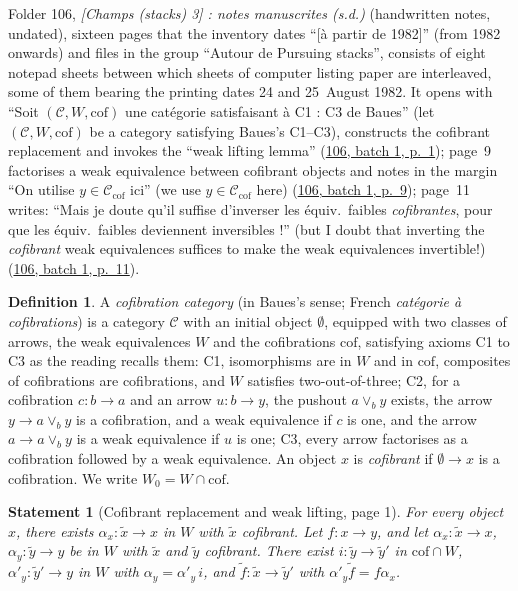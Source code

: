 \documentclass[11pt]{article}
\newcommand{\q}[1]{“#1”}
\newcommand{\fr}[1]{\textfrench{#1}}
\newcommand{\lot}[3]{\href{https://grothendieck.commutator.io/\##1/#2/p#3}{#1, batch #2, p.~#3}}
\theoremstyle{plain}
\newtheorem*{enonce}{Statement}
\theoremstyle{definition}
\newtheorem*{definition}{Definition}
\theoremstyle{remark}
\begin{document}
Folder 106, \emph{\fr{[Champs (stacks) 3] : notes manuscrites (s.d.)}} (handwritten notes, undated), sixteen pages that the inventory dates \q{\fr{[à partir de 1982]}} (from 1982 onwards) and files in the group \q{Autour de Pursuing stacks}, consists of eight notepad sheets between which sheets of computer listing paper are interleaved, some of them bearing the printing dates 24 and 25~August 1982. It opens with \q{\fr{Soit $(\mathcal{C}, W, \mathrm{cof})$ une catégorie satisfaisant à C1 : C3 de Baues}} (let $(\mathcal{C}, W, \mathrm{cof})$ be a category satisfying Baues's C1--C3), constructs the cofibrant replacement and invokes the \q{weak lifting lemma} (\lot{106}{1}{1}); page~9 factorises a weak equivalence between cofibrant objects and notes in the margin \q{\fr{On utilise $y \in \mathcal{C}_{\mathrm{cof}}$ ici}} (we use $y \in \mathcal{C}_{\mathrm{cof}}$ here) (\lot{106}{1}{9}); page~11 writes: \q{\fr{Mais je doute qu'il suffise d'inverser les équiv.\ faibles \emph{cofibrantes}, pour que les équiv.\ faibles deviennent inversibles !}} (but I doubt that inverting the \emph{cofibrant} weak equivalences suffices to make the weak equivalences invertible!) (\lot{106}{1}{11}).

\begin{definition}
A \emph{cofibration category} (in Baues's sense; French \emph{catégorie à cofibrations}) is a category $\mathcal C$ with an initial object $\emptyset$, equipped with two classes of arrows, the weak equivalences $W$ and the cofibrations $\mathrm{cof}$, satisfying axioms C1 to C3 as the reading recalls them: C1, isomorphisms are in $W$ and in $\mathrm{cof}$, composites of cofibrations are cofibrations, and $W$ satisfies two-out-of-three; C2, for a cofibration $c : b \to a$ and an arrow $u : b \to y$, the pushout $a \vee_b y$ exists, the arrow $y \to a \vee_b y$ is a cofibration, and a weak equivalence if $c$ is one, and the arrow $a \to a \vee_b y$ is a weak equivalence if $u$ is one; C3, every arrow factorises as a cofibration followed by a weak equivalence. An object $x$ is \emph{cofibrant} if $\emptyset \to x$ is a cofibration. We write $W_0 = W \cap \mathrm{cof}$.
\end{definition}

\begin{enonce}[Cofibrant replacement and weak lifting, page 1]
For every object $x$, there exists $\alpha_x : \widetilde x \to x$ in $W$ with $\widetilde x$ cofibrant. Let $f : x \to y$, and let $\alpha_x : \widetilde x \to x$, $\alpha_y : \widetilde y \to y$ be in $W$ with $\widetilde x$ and $\widetilde y$ cofibrant. There exist $i : \widetilde y \to \widetilde y'$ in $\mathrm{cof} \cap W$, $\alpha'_y : \widetilde y' \to y$ in $W$ with $\alpha_y = \alpha'_y\, i$, and $\widetilde f : \widetilde x \to \widetilde y'$ with $\alpha'_y \widetilde f = f \alpha_x$.
\end{enonce}
\end{document}
